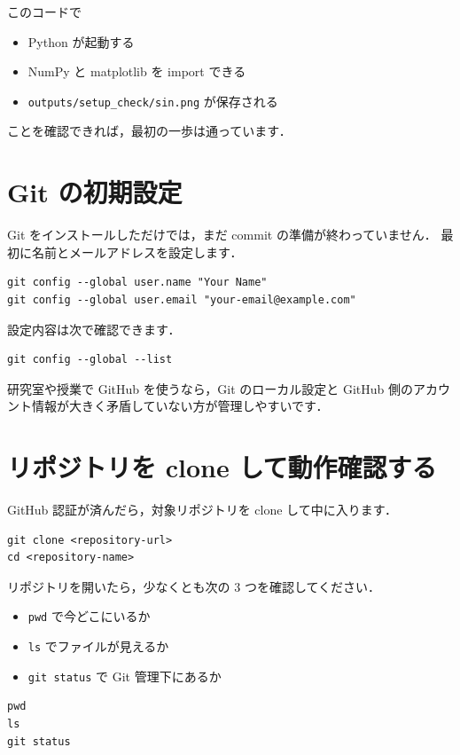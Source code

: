 このコードで
\begin{itemize}
\item Python が起動する
\item NumPy と matplotlib を import できる
\item \texttt{outputs/setup\_check/sin.png} が保存される
\end{itemize}
ことを確認できれば，最初の一歩は通っています．


\section{Git の初期設定}

Git をインストールしただけでは，まだ commit の準備が終わっていません．
最初に名前とメールアドレスを設定します．

\begin{lstlisting}[style=codecell]
git config --global user.name "Your Name"
git config --global user.email "your-email@example.com"
\end{lstlisting}

設定内容は次で確認できます．

\begin{lstlisting}[style=codecell]
git config --global --list
\end{lstlisting}

研究室や授業で GitHub を使うなら，Git のローカル設定と GitHub 側のアカウント情報が大きく矛盾していない方が管理しやすいです．


\section{リポジトリを clone して動作確認する}

GitHub 認証が済んだら，対象リポジトリを clone して中に入ります．

\begin{lstlisting}[style=codecell]
git clone <repository-url>
cd <repository-name>
\end{lstlisting}

リポジトリを開いたら，少なくとも次の 3 つを確認してください．
\begin{itemize}
\item \texttt{pwd} で今どこにいるか
\item \texttt{ls} でファイルが見えるか
\item \texttt{git status} で Git 管理下にあるか
\end{itemize}

\begin{lstlisting}[style=codecell]
pwd
ls
git status
\end{lstlisting}


